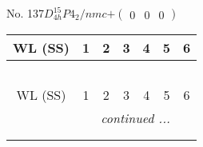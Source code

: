 \documentclass[fleqn,9pt,landscape]{jsarticle}
\begin{document}
\newpage
No. 137\quad$D_{4h}^{15}$\quad$P4_2/nmc$\quad[ tetragonal ]\quad$+\begin{pmatrix} 0 & 0 & 0 \end{pmatrix}$
\begin{center}
\renewcommand{\arraystretch}{1.2}
\begin{longtable}{ccccccc}
 \hline \hline
WL (SS) & 1 & 2 & 3 & 4 & 5 & 6 \\ \hline \endfirsthead

\multicolumn{6}{l}{\tablename\ \thetable{}} \\
 \hline \hline
WL (SS) & 1 & 2 & 3 & 4 & 5 & 6 \\ \hline \endhead

 \hline \hline
\multicolumn{6}{r}{\footnotesize\it continued ...} \\ \endfoot

 \hline \hline
\multicolumn{6}{r}{} \\ \endlastfoot


\end{longtable}
\end{center}
\end{document}
